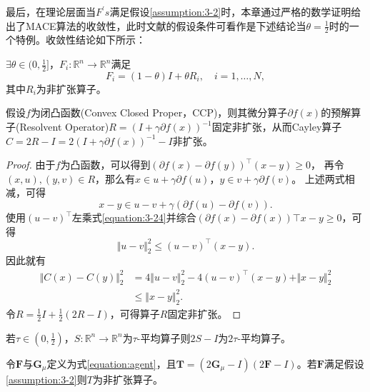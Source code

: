 最后，在理论层面当$F^\prime{s}$满足假设\ref{assumption:3-2}时，本章通过严格的数学证明给出了MACE算法的收敛性，此时文献\cite{Xiran}的假设条件可看作是下述结论当$\theta=\frac{1}{2}$时的一个特例。收敛性结论如下所示：
\begin{assumption} \label{assumption:3-2}
	$\exists{\theta\in(0,\frac{1}{2}]}$，$F_{i}\colon\mathbb{R}^{n}\to\mathbb{R}^{n}$满足
	\begin{equation}
		F_i=(1-\theta)I+\theta{R_i},\quad{i=1,\ldots,N},
	\end{equation}
	其中$R_i$为非扩张算子。
\end{assumption}
\begin{lemma}\label{lemma:3-2}
	假设$f$为闭凸函数(Convex Closed Proper，CCP)，则其微分算子$\partial{f(x)}$的预解算子(Resolvent Operator)$R=(I+\gamma{\partial{f(x)}})^{-1}$固定非扩张，从而Cayley算子$C=2R-I=2(I+\gamma{\partial{f(x)}})^{-1}-I$非扩张。
\end{lemma}
\begin{proof}
	由于$f$为凸函数，可以得到$(\partial{f(x)}-\partial{f(y)})^\top(x-y)\geq{0}$，
	再令$(x,u),(y,v)\in{R}$，那么有$x\in{u+\gamma\partial{f(u)}}$，$y\in{v+\gamma\partial{f(v)}}$。
	上述两式相减，可得
	\begin{equation} \label{equation:3-24}
		x-y\in{u - v + \gamma(\partial{f(u)}-\partial{f(v)})}.
	\end{equation}
	使用$(u-v)^\top$左乘式\eqref{equation:3-24}并综合$(\partial{f(x)}-\partial{f(x)})\top{x-y}\geq{0}$，可得
	\begin{equation}
		\Vert{u-v}\Vert_2^2\leq(u-v)^\top(x-y).
	\end{equation}
	因此就有
	\begin{equation}
		\begin{aligned}
			\Vert{C(x)-C(y)}\Vert_2^2
			&=4\Vert{u-v}\Vert_2^2-4(u-v)^\top(x-y)+\Vert{x-y}\Vert_2^2 \\
			&\leq{\Vert{x-y}\Vert_2^2}.
		\end{aligned}
	\end{equation}
	令$R=\frac{1}{2}I+\frac{1}{2}(2R-I)$，可得算子$R$固定非扩张。
\end{proof}
\begin{lemma}\label{lemma:3-3}
	若$\tau\in(0,\frac{1}{2})$，$S\colon\mathbb{R}^n\to\mathbb{R}^n$为$\tau$-平均算子则$2S-I$为$2\tau$-平均算子。
\end{lemma}
\begin{proposition}
	令$\mathbf{F}$与$\mathbf{G}_{\mu}$定义为式\eqref{equation:agent}，且$\mathbf{T}=\left({2\mathbf{G}_{\mu}-I}\right)\left({2\mathbf{F}-I}\right)$。若$\mathbf{F}$满足假设\ref{assumption:3-2}则$T$为非扩张算子。
\end{proposition}
